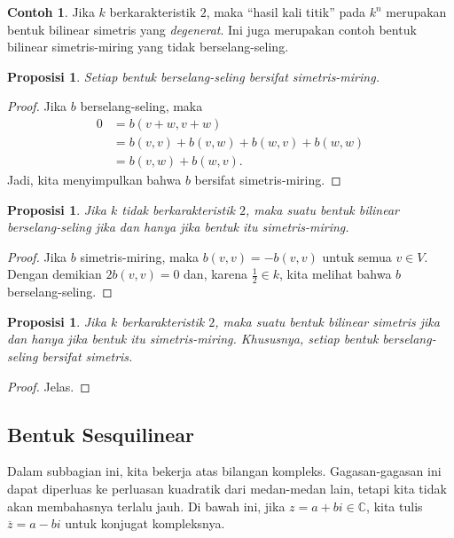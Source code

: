\documentclass[12pt]{article}
\theoremstyle{plain}
\newtheorem{proposition}[theorem]{Proposisi}
\theoremstyle{definition}
\newtheorem{example}[theorem]{Contoh}
\theoremstyle{remark}
\numberwithin{equation}{section}
\begin{document}
\begin{example}
Jika $k$ berkarakteristik $2$, maka “hasil kali titik”
pada $k^n$ merupakan bentuk bilinear simetris yang \emph{degenerat}.
Ini juga merupakan contoh bentuk bilinear simetris-miring yang tidak
berselang-seling.
\end{example}

\begin{proposition}
Setiap bentuk berselang-seling bersifat simetris-miring.
\end{proposition}

\begin{proof}
Jika $b$ berselang-seling, maka
\begin{align*}
0 &= b(v+w,v+w)\\
&= b(v,v) + b(v,w) + b(w,v) + b(w,w)\\
&= b(v,w)+b(w,v)
.\end{align*}
Jadi, kita menyimpulkan bahwa $b$ bersifat simetris-miring.
\end{proof}

\begin{proposition}
Jika $k$ \emph{tidak} berkarakteristik $2$, maka suatu bentuk bilinear
berselang-seling jika dan hanya jika bentuk itu simetris-miring.
\end{proposition}

\begin{proof}
Jika $b$ simetris-miring, maka $b(v,v)=-b(v,v)$ untuk semua $v \in V$.
Dengan demikian $2b(v,v)=0$ dan, karena $\frac{1}{2} \in k$,
kita melihat bahwa $b$ berselang-seling.
\end{proof}

\begin{proposition}
Jika $k$ berkarakteristik $2$, maka suatu bentuk bilinear
simetris jika dan hanya jika bentuk itu simetris-miring.
Khususnya, setiap bentuk berselang-seling bersifat simetris.
\end{proposition}

\begin{proof}
Jelas.
\end{proof}

\subsection{Bentuk Sesquilinear}

Dalam subbagian ini, kita bekerja atas bilangan kompleks.
Gagasan-gagasan ini dapat diperluas ke perluasan kuadratik dari medan-medan
lain, tetapi kita tidak akan membahasnya terlalu jauh.
Di bawah ini, jika $z=a+bi \in \mathbb{C}$, kita tulis
$\overline{z}=a-bi$ untuk konjugat kompleksnya.
\end{document}
